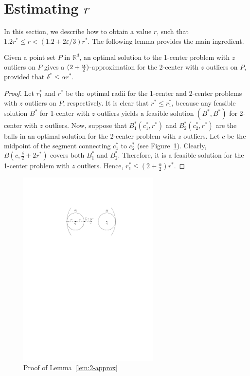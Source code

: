 \documentclass[envcountsame]{cls/cccg15}
\newcommand{\IR}{\ensuremath{\mathbb{R}}}
\newcommand{\lee}{\leqslant}
\renewcommand{\le}{\lee}
\newcommand{\eps}{\varepsilon}
\begin{document}



\section{Estimating $r$}
\label{sec:estimate}

In this section, we describe how to obtain a value $r$,
such that $1.2r^* \le r < (1.2 + 2\eps/3)r^*$.
The following lemma provides the main ingredient.

\begin{lemma}
\label{lem:2-approx}
	Given a point set $P$ in $\IR^d$,
	an optimal solution to the 1-center problem with $z$ outliers on $P$
	gives a $(2 + {\alpha \over 2})$-approximation for
	the 2-center with $z$ outliers on $P$,
	provided that $\delta^* \le \alpha r^*$.
\end{lemma}


\begin{proof}
Let $r_1^*$ and $r^*$ be the optimal radii for
the 1-center and 2-center problems with $z$ outliers on $P$, respectively.
It is clear that $r^* \le r_1^*$,
because any feasible solution $B^*$ for 1-center with $z$ outliers
yields a feasible solution $(B^*, B^*)$ for 2-center with $z$ outliers.
Now, suppose that $B_1^*(c_1^*, r^*)$ and $B_2^*(c_2^*, r^*)$
are the balls in an optimal solution for the 2-center problem with $z$ outliers.
Let $c$ be the midpoint of the segment connecting 
$c_1^*$ to $c_2^*$ (see Figure~\ref{fig:2lt1}).
Clearly, $B\left(c, \frac{\delta}{2} + 2r^*\right)$ covers both $B_1^*$ and $B_2^*$. 
Therefore, it is a feasible solution for the 1-center problem with $z$ outliers.
Hence, $ r_1^* \le \left(2 + \frac{\alpha}{2}\right) r^*$.
\end{proof}

\begin{figure}[th]
	\centering
	\includegraphics[width=19em]{figs/2lt1}
	\caption{Proof of Lemma~\ref{lem:2-approx}}
	\label{fig:2lt1}
\end{figure}
\end{document}
